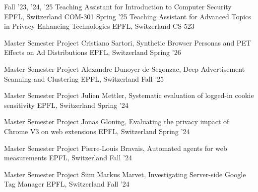 
\begin{cvhonors}

  \cvhonor
  {Fall '23, '24, '25} %
  {Teaching Assistant for Introduction to Computer Security} %
  {EPFL, Switzerland} %
  {COM-301} %
  \cvhonor
  {Spring '25} %
  {Teaching Assistant for Advanced Topics in Privacy Enhancing Technologies} %
  {EPFL, Switzerland} %
  {CS-523} %

\end{cvhonors}


\begin{cvhonors}


  \cvhonor
  {Master Semester Project}
  {Cristiano Sartori, Synthetic Browser Personas and PET Effects on Ad Distributions}
  {EPFL, Switzerland}
  {Spring '26}

  \cvhonor
  {Master Semester Project}
  {Alexandre Dunoyer de Segonzac, Deep Advertisement Scanning and Clustering}
  {EPFL, Switzerland}
  {Fall '25}

  \cvhonor
  {Master Semester Project} %
  {Julien Mettler, Systematic evaluation of logged-in cookie sensitivity} %
  {EPFL, Switzerland} %
  {Spring '24} %

  \cvhonor
  {Master Semester Project} %
  {Jonas Gloning, Evaluating the privacy impact of Chrome V3 on web extensions} %
  {EPFL, Switzerland} %
  {Spring '24} %

  \cvhonor
  {Master Semester Project} %
  {Pierre-Louis Bravais, Automated agents for web measurements} %
  {EPFL, Switzerland} %
  {Fall '24} %

  \cvhonor
  {Master Semester Project} %
  {Siim Markus Marvet, Investigating Server-side Google Tag Manager} %
  {EPFL, Switzerland} %
  {Fall '24} %

\end{cvhonors}
